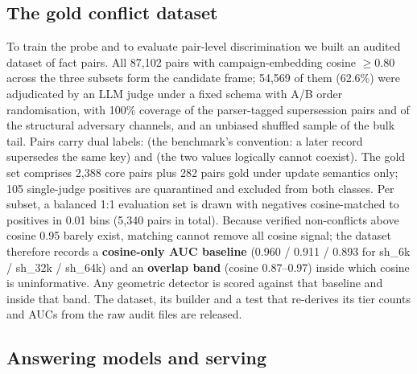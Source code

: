 \documentclass[journal=jcisd8,manuscript=article]{achemso}
\begin{document}
\subsection{The gold conflict dataset}
\label{sec:gold}

To train the probe and to evaluate pair-level discrimination we built an audited dataset of fact pairs. All 87,102 pairs with campaign-embedding cosine $\geq0.80$ across the three subsets form the candidate frame; 54,569 of them (62.6\%) were adjudicated by an LLM judge under a fixed schema with A/B order randomisation, with 100\% coverage of the parser-tagged supersession pairs and of the structural adversary channels, and an unbiased shuffled sample of the bulk tail. Pairs carry dual labels:  (the benchmark's convention: a later record supersedes the same key) and  (the two values logically cannot coexist). The gold set comprises 2,388 core pairs plus 282 pairs gold under update semantics only; 105 single-judge positives are quarantined and excluded from both classes. Per subset, a balanced 1:1 evaluation set is drawn with negatives cosine-matched to positives in 0.01 bins (5,340 pairs in total). Because verified non-conflicts above cosine 0.95 barely exist, matching cannot remove all cosine signal; the dataset therefore records a \textbf{cosine-only AUC baseline} (0.960 / 0.911 / 0.893 for sh\_6k / sh\_32k / sh\_64k) and an \textbf{overlap band} (cosine 0.87--0.97) inside which cosine is uninformative. Any geometric detector is scored against that baseline and inside that band. The dataset, its builder and a test that re-derives its tier counts and AUCs from the raw audit files are released.

\subsection{Answering models and serving}

\begin{table}[H]\centering
\caption{Answering models. Qwen3-4B-Instruct-2507 is the reference model on which the detector was developed; the other four were added after every parameter was frozen.}
\label{tab:models}\end{table}
\end{document}
